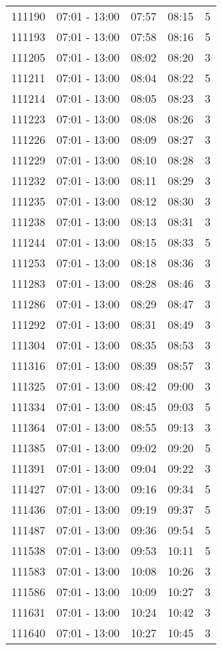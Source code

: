\documentclass{article}
\begin{document}
\begin{tabular}{llccc}
111190 & 07:01 - 13:00 & 07:57 & 08:15 & 5 \\
111193 & 07:01 - 13:00 & 07:58 & 08:16 & 5 \\
111205 & 07:01 - 13:00 & 08:02 & 08:20 & 3 \\
111211 & 07:01 - 13:00 & 08:04 & 08:22 & 5 \\
111214 & 07:01 - 13:00 & 08:05 & 08:23 & 3 \\
111223 & 07:01 - 13:00 & 08:08 & 08:26 & 3 \\
111226 & 07:01 - 13:00 & 08:09 & 08:27 & 3 \\
111229 & 07:01 - 13:00 & 08:10 & 08:28 & 3 \\
111232 & 07:01 - 13:00 & 08:11 & 08:29 & 3 \\
111235 & 07:01 - 13:00 & 08:12 & 08:30 & 3 \\
111238 & 07:01 - 13:00 & 08:13 & 08:31 & 3 \\
111244 & 07:01 - 13:00 & 08:15 & 08:33 & 5 \\
111253 & 07:01 - 13:00 & 08:18 & 08:36 & 3 \\
111283 & 07:01 - 13:00 & 08:28 & 08:46 & 3 \\
111286 & 07:01 - 13:00 & 08:29 & 08:47 & 3 \\
111292 & 07:01 - 13:00 & 08:31 & 08:49 & 3 \\
111304 & 07:01 - 13:00 & 08:35 & 08:53 & 3 \\
111316 & 07:01 - 13:00 & 08:39 & 08:57 & 3 \\
111325 & 07:01 - 13:00 & 08:42 & 09:00 & 3 \\
111334 & 07:01 - 13:00 & 08:45 & 09:03 & 5 \\
111364 & 07:01 - 13:00 & 08:55 & 09:13 & 3 \\
111385 & 07:01 - 13:00 & 09:02 & 09:20 & 5 \\
111391 & 07:01 - 13:00 & 09:04 & 09:22 & 3 \\
111427 & 07:01 - 13:00 & 09:16 & 09:34 & 5 \\
111436 & 07:01 - 13:00 & 09:19 & 09:37 & 5 \\
111487 & 07:01 - 13:00 & 09:36 & 09:54 & 5 \\
111538 & 07:01 - 13:00 & 09:53 & 10:11 & 5 \\
111583 & 07:01 - 13:00 & 10:08 & 10:26 & 3 \\
111586 & 07:01 - 13:00 & 10:09 & 10:27 & 3 \\
111631 & 07:01 - 13:00 & 10:24 & 10:42 & 3 \\
111640 & 07:01 - 13:00 & 10:27 & 10:45 & 3 \\

\end{tabular}
\end{document}
